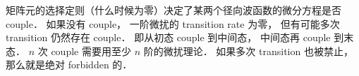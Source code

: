 
矩阵元的选择定则（什么时候为零）决定了某两个径向波函数的微分方程是否 couple． 如果没有 couple， 一阶微扰的 transition rate 为零， 但有可能多次 transition 仍然存在 couple． 即从初态 couple 到中间态， 中间态再 couple 到末态． $n$ 次 couple 需要用至少 $n$ 阶的微扰理论． 如果多次 transition 也被禁止， 那么就是绝对 forbidden 的．

